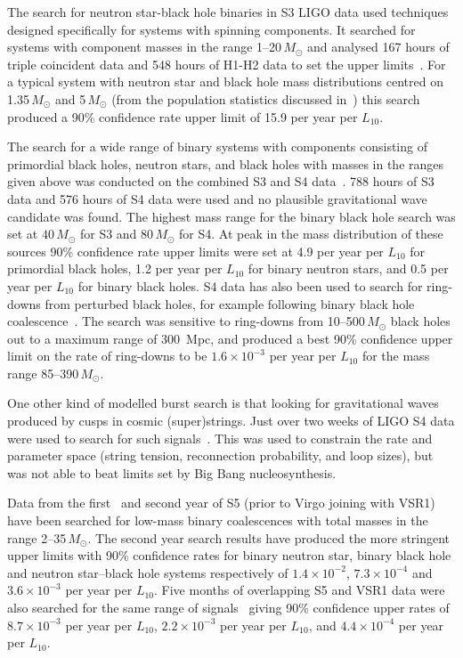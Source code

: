 \documentclass{article}
\begin{document}
The search for neutron star-black hole binaries in S3 LIGO data used techniques
designed specifically for systems with spinning components. It searched for
systems with component masses in the range 1--20\,$M_{\odot}$ and analysed 167
hours of triple coincident data and 548 hours of H1-H2 data to set the upper
limits~\cite{Abbott:2008d}. For a typical system with neutron star and black
hole mass distributions centred on 1.35\,$M_{\odot}$ and 5\,$M_{\odot}$ (from
the population statistics discussed in~\cite{Abbott:2008a}) this search produced
a 90\% confidence rate upper limit of 15.9 per year per $L_{10}$.

The search for a wide range of binary systems with components consisting of
primordial black holes, neutron stars, and black holes with masses in the ranges
given above was conducted on the combined S3 and S4 data~\cite{Abbott:2008a}.
788 hours of S3 data and 576 hours of S4 data were used and no plausible
gravitational wave candidate was found. The highest mass range for the binary
black hole search was set at $40\,M_{\odot}$ for S3 and $80\,M_{\odot}$ for S4. At peak in the
mass distribution of these sources 90\% confidence rate upper limits were set at
4.9 per year per $L_{10}$ for primordial black holes, 1.2 per year per $L_{10}$
for binary neutron stars, and 0.5 per year per $L_{10}$ for binary black holes.
S4 data has also been used to search for ring-downs from perturbed black holes,
for example following binary black hole coalescence~\cite{Abbott:2009g}. The
search was sensitive to ring-downs from 10--500\,$M_{\odot}$ black holes out to
a maximum range of 300~Mpc, and produced a best 90\% confidence upper limit on
the rate of ring-downs to be $1.6\times10^{-3}$ per year per $L_{10}$ for the
mass range 85--390\,$M_{\odot}$.

One other kind of modelled burst search is that looking for gravitational waves
produced by cusps in cosmic (super)strings. Just over two weeks of LIGO S4 data
were used to search for such signals~\cite{Abbott:2009j}. This was used to
constrain the rate and parameter space (string tension, reconnection
probability, and loop sizes), but was not able to beat limits set by Big Bang
nucleosynthesis.

Data from the first~\cite{Abbott:2009e} and second year of S5 (prior to Virgo
joining with VSR1)~\cite{Abbott:2009f} have been searched for low-mass binary
coalescences with total masses in the range 2--35\,$M_{\odot}$. The second
year search results have produced the more stringent upper limits with 90\%
confidence rates for binary neutron star, binary black hole and neutron
star--black hole systems respectively of $1.4\times10^{-2}$, $7.3\times10^{-4}$
and $3.6\times10^{-3}$ per year per $L_{10}$. Five months of overlapping S5 and
VSR1 data were also searched for the same range of signals~\cite{Abadie:2010f}
giving 90\% confidence upper rates of $8.7\times10^{-3}$ per year per $L_{10}$,
$2.2\times10^{-3}$ per year per $L_{10}$, and $4.4\times10^{-4}$ per year per
$L_{10}$.
\end{document}
